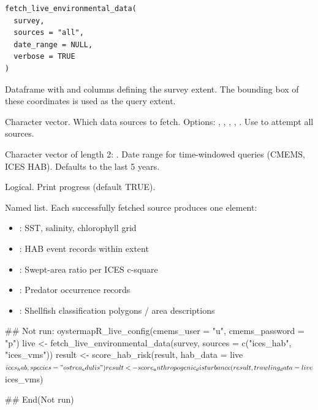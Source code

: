 \documentclass[a4paper]{book}
\begin{document}
%
\begin{Usage}
\begin{verbatim}
fetch_live_environmental_data(
  survey,
  sources = "all",
  date_range = NULL,
  verbose = TRUE
)
\end{verbatim}
\end{Usage}
%
\begin{Arguments}
\begin{ldescription}
\item[\code{survey}] Dataframe with  and  columns defining the survey
extent. The bounding box of these coordinates is used as the query extent.

\item[\code{sources}] Character vector. Which data sources to fetch. Options:
, , , ,
. Use  to attempt all sources.

\item[\code{date\_range}] Character vector of length 2: .
Date range for time-windowed queries (CMEMS, ICES HAB). Defaults to
the last 5 years.

\item[\code{verbose}] Logical. Print progress (default TRUE).
\end{ldescription}
\end{Arguments}
%
\begin{Value}
Named list. Each successfully fetched source produces one element:
\begin{itemize}

\item{} : SST, salinity, chlorophyll grid
\item{} : HAB event records within extent
\item{} : Swept-area ratio per ICES c-square
\item{} : Predator occurrence records
\item{} : Shellfish classification polygons / area descriptions

\end{itemize}

\end{Value}
%
\begin{Examples}
\begin{ExampleCode}
## Not run: 
oystermapR_live_config(cmems_user = "u", cmems_password = "p")
live <- fetch_live_environmental_data(survey, sources = c("ices_hab", "ices_vms"))
result <- score_hab_risk(result, hab_data = live$ices_hab, species = "ostrea_edulis")
result <- score_anthropogenic_disturbance(result, trawling_data = live$ices_vms)

## End(Not run)
\end{ExampleCode}
\end{Examples}
\end{document}
